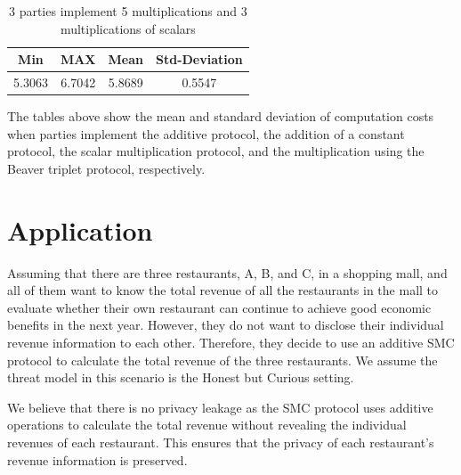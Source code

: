 \documentclass[10pt,conference,compsocconf]{IEEEtran}
\begin{document}
\begin {table}[H]
\caption {3 parties implement 5 multiplications and 3 multiplications of scalars} \label{tab:title} 
\begin{center}
\begin{tabular}{||c c c c||} 
 \hline
 Min & MAX & Mean & Std-Deviation \\ [0.5ex] 
 \hline\hline
5.3063 & 6.7042 & 5.8689 & 0.5547 \\ [1ex] 
 \hline
\end{tabular}
\end{center}
\end {table}

The tables above show the mean and standard deviation of computation costs when parties implement the additive protocol, the addition of a constant protocol, the scalar multiplication protocol, and the multiplication using the Beaver triplet protocol, respectively.

\section{Application}

Assuming that there are three restaurants, A, B, and C, in a shopping mall, and all of them want to know the total revenue of all the restaurants in the mall to evaluate whether their own restaurant can continue to achieve good economic benefits in the next year. However, they do not want to disclose their individual revenue information to each other. Therefore, they decide to use an additive SMC protocol to calculate the total revenue of the three restaurants. We assume the threat model in this scenario is the Honest but Curious setting.

We believe that there is no privacy leakage as the SMC protocol uses additive operations to calculate the total revenue without revealing the individual revenues of each restaurant. This ensures that the privacy of each restaurant's revenue information is preserved.



\end{document}
